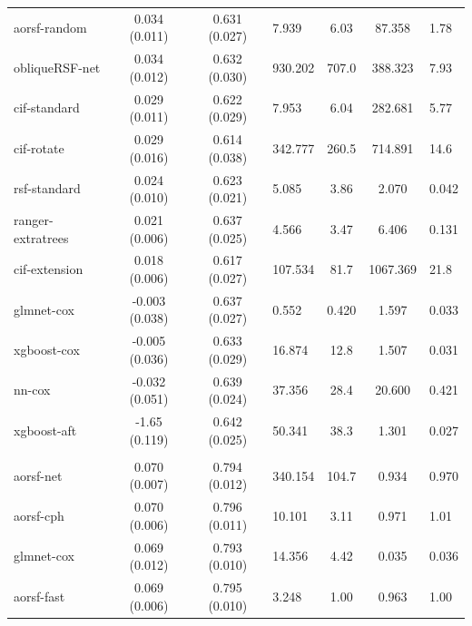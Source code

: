 \documentclass[twoside,11pt]{article}\usepackage[]{graphicx}\usepackage[]{xcolor}
\newenvironment{knitrout}{}{} %
\begin{document}
\begin{knitrout}
\begin{longtable}{lcclccl}
\hspace{1em}aorsf-random & 0.034 (0.011) & 0.631 (0.027) & 7.939 & 6.03 & 87.358 & 1.78\\
\hspace{1em}obliqueRSF-net & 0.034 (0.012) & 0.632 (0.030) & 930.202 & 707.0 & 388.323 & 7.93\\
\hspace{1em}cif-standard & 0.029 (0.011) & 0.622 (0.029) & 7.953 & 6.04 & 282.681 & 5.77\\
\hspace{1em}cif-rotate & 0.029 (0.016) & 0.614 (0.038) & 342.777 & 260.5 & 714.891 & 14.6\\
\hspace{1em}rsf-standard & 0.024 (0.010) & 0.623 (0.021) & 5.085 & 3.86 & 2.070 & 0.042\\
\hspace{1em}ranger-extratrees & 0.021 (0.006) & 0.637 (0.025) & 4.566 & 3.47 & 6.406 & 0.131\\
\hspace{1em}cif-extension & 0.018 (0.006) & 0.617 (0.027) & 107.534 & 81.7 & 1067.369 & 21.8\\
\hspace{1em}glmnet-cox & -0.003 (0.038) & 0.637 (0.027) & 0.552 & 0.420 & 1.597 & 0.033\\
\hspace{1em}xgboost-cox & -0.005 (0.036) & 0.633 (0.029) & 16.874 & 12.8 & 1.507 & 0.031\\
\hspace{1em}nn-cox & -0.032 (0.051) & 0.639 (0.024) & 37.356 & 28.4 & 20.600 & 0.421\\
\hspace{1em}xgboost-aft & -1.65 (0.119) & 0.642 (0.025) & 50.341 & 38.3 & 1.301 & 0.027\\
\addlinespace[0.3em]
\hline
\multicolumn{7}{l}{\textit{\textbf{SPRINT; CVD death, n = 9361, p = 174}}}\\
\hline
\hspace{1em}aorsf-net & 0.070 (0.007) & 0.794 (0.012) & 340.154 & 104.7 & 0.934 & 0.970\\
\hspace{1em}aorsf-cph & 0.070 (0.006) & 0.796 (0.011) & 10.101 & 3.11 & 0.971 & 1.01\\
\hspace{1em}glmnet-cox & 0.069 (0.012) & 0.793 (0.010) & 14.356 & 4.42 & 0.035 & 0.036\\
\hspace{1em}aorsf-fast & 0.069 (0.006) & 0.795 (0.010) & 3.248 & 1.00 & 0.963 & 1.00\\

\end{longtable}
\end{knitrout}
\end{document}
